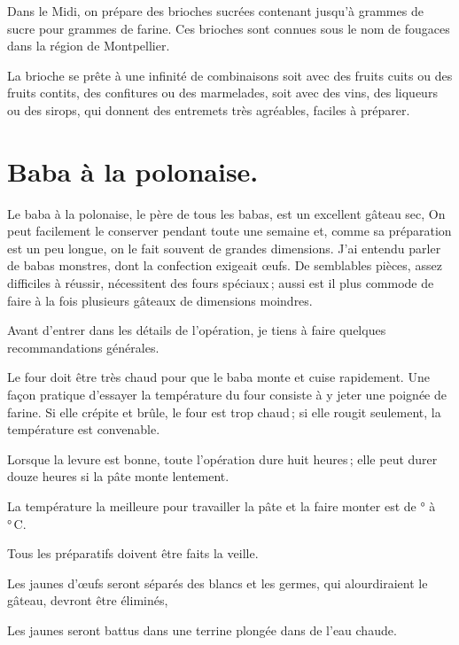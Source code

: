 Dans le Midi, on prépare des brioches sucrées contenant jusqu'à {\mmm}
grammes de sucre pour {\mmm} grammes de farine. Ces brioches sont
connues sous le nom de fougaces dans la région de Montpellier.

\sk

La brioche se prête à une infinité de combinaisons soit avec des fruits cuits
ou des fruits contits, des confitures ou des marmelades, soit avec des vins,
des liqueurs ou des sirops, qui donnent des entremets très agréables, faciles
à préparer.

\section*{\centering Baba à la polonaise.}
{}

Le baba à la polonaise, le père de tous les babas, est un excellent gâteau sec,
On peut facilement le conserver pendant toute une semaine et, comme sa
préparation est un peu longue, on le fait souvent de grandes dimensions. J'ai
entendu parler de babas monstres, dont la confection exigeait {\mmm}
œufs. De semblables pièces, assez difficiles à réussir, nécessitent des fours
spéciaux ; aussi est il plus commode de faire à la fois plusieurs gâteaux de
dimensions moindres.

\medskip

Avant d'entrer dans les détails de l'opération, je tiens à faire quelques
recommandations générales.

Le four doit être très chaud pour que le baba monte et cuise rapidement. Une
façon pratique d'essayer la température du four consiste à y jeter une poignée
de farine. Si elle crépite et brûle, le four est trop chaud ; si elle rougit
seulement, la température est convenable.

Lorsque la levure est bonne, toute l'opération dure huit heures ; elle peut
durer douze heures si la pâte monte lentement.

La température la meilleure pour travailler la pâte et la faire monter est de
{\mmm}° à {\mmm}° C.

Tous les préparatifs doivent être faits la veille.

Les jaunes d'œufs seront séparés des blancs et les germes, qui alourdiraient le
gâteau, devront être éliminés,

Les jaunes seront battus dans une terrine plongée dans de l'eau chaude.

